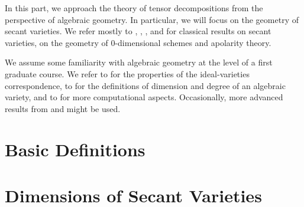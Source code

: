In this part, we approach the theory of tensor decompositions from the perspective of algebraic geometry. In particular, we will focus on the geometry of secant varieties. We refer mostly to \cite{Zak93}, \cite{IK99}, \cite{CGO14}, \cite{Rus16} and \cite{BCCGO18} for classical results on secant varieties, on the geometry of $0$-dimensional schemes and apolarity theory. 

We assume some familiarity with algebraic geometry at the level of a first graduate course. We refer to \cite{Sha94} for the properties of the ideal-varieties correspondence, to \cite{Har92} for the definitions of dimension and degree of an algebraic variety, and to \cite{CLO07} for more computational aspects. Occasionally, more advanced results from \cite{Mum76} and \cite{Vak24} might be used. 

\chapter{Basic Definitions}
\label{geometrySecants-chapter-BasicDefinitions}


\chapter{Dimensions of Secant Varieties}
\label{geometrySecants-chapter-DimensionsSecants}


% 
% 
% 
% 
% 


% 



